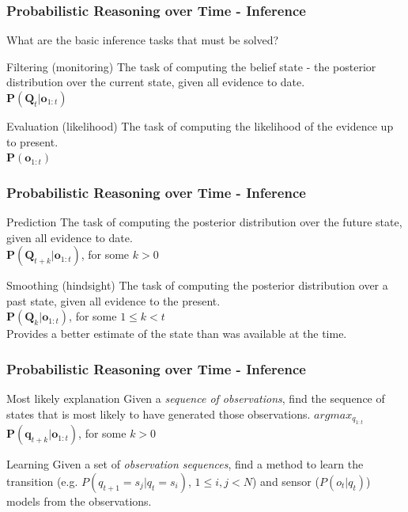 \begin{frame}
  \frametitle{Probabilistic Reasoning over Time - Inference}
	What are the basic inference tasks that must be solved?
	\pause	
	
	\begin{block}{Filtering (monitoring)}
		The task of computing the \alert{belief state} - the posterior distribution over the 
		\alert{current state}, given all evidence to date.\\
		$\mathbf{P}(\mathbf{Q}_t \vert \mathbf{o}_{1:t})$
	\end{block}
	\pause
	
	\begin{block}{Evaluation (likelihood)}
		The task of computing the \alert{likelihood} of the evidence up to present.\\
		$\mathbf{P}(\mathbf{o}_{1:t})$
	\end{block}  
\end{frame}

\begin{frame}
  \frametitle{Probabilistic Reasoning over Time - Inference}
	\begin{block}{Prediction}
		The task of computing the posterior distribution over the \alert{future state}, 
		given all evidence to date.\\
		$\mathbf{P}(\mathbf{Q}_{t+k} \vert \mathbf{o}_{1:t})$, for some $k > 0$
	\end{block}
	\pause
	
	\begin{block}{Smoothing (hindsight)}
		The task of computing the posterior distribution over a \alert{past state}, 
		given all evidence to the present.\\
		$\mathbf{P}(\mathbf{Q}_k \vert \mathbf{o}_{1:t})$, for some $1 \le k < t$\\
		Provides a better estimate of the state than was available at the time.
	\end{block}
\end{frame}

\begin{frame}
  \frametitle{Probabilistic Reasoning over Time - Inference}
	\begin{block}{Most likely explanation}
		Given a \emph{sequence of observations}, find the \alert{sequence of states} that is 
		\alert{most likely} to have generated those observations.
		$argmax_{q_{1:t}}$ $\mathbf{P}(\mathbf{q}_{t+k} \vert \mathbf{o}_{1:t})$, for some $k > 0$
	\end{block}
	\pause
	
	\begin{block}{Learning}
		Given a set of \emph{observation sequences}, find a method to learn the \alert{transition} 
		(e.g. $P(q_{t+1} = s_j \vert q_t = s_i)$, $1 \le i,j < N$) and \alert{sensor} ($P(o_t \vert q_t)$) 
		\alert{models} from the observations.
	\end{block}
\end{frame}

